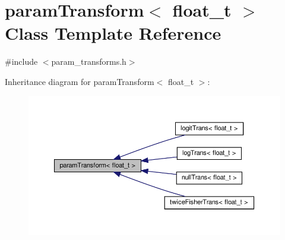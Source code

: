 \hypertarget{classparamTransform}{}\section{param\+Transform$<$ float\+\_\+t $>$ Class Template Reference}
\label{classparamTransform}


{\ttfamily \#include $<$param\+\_\+transforms.\+h$>$}



Inheritance diagram for param\+Transform$<$ float\+\_\+t $>$\+:
\nopagebreak
\begin{figure}[H]
\begin{center}
\leavevmode
\includegraphics[width=350pt]{classparamTransform__inherit__graph}
\end{center}
\end{figure}
